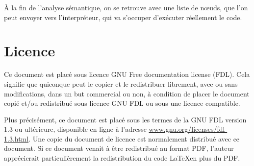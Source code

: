 \documentclass{article}
\begin{document}
À la fin de l’analyse sémantique, on se retrouve avec une liste de nœuds, que l’on peut envoyer
vers l’interpréteur, qui va s’occuper d’exécuter réellement le code.

\printbibliography

\section*{Licence}
Ce document est placé sous licence GNU Free documentation license (FDL).
Cela signifie que quiconque peut le copier et le redistribuer librement, avec ou
sans modifications, dans un but commercial ou non, à condition de placer le
document copié et/ou redistribué sous licence GNU FDL ou sous une licence
compatible.

Plus précisément, ce document est placé sous les termes de la GNU FDL version 1.3 ou
ultérieure, disponible en ligne à l’adresse
\href{www.gnu.org/licenses/fdl-1.3.html}{www.gnu.org/licenses/fdl-1.3.html}.
Une copie du document de licence est normalement distribué avec ce document.
Si ce document venait à être redistribué au format PDF, l’auteur apprécierait
particulièrement la redistribution du code \LaTeX\nobreakspace en plus du PDF.
\end{document}

